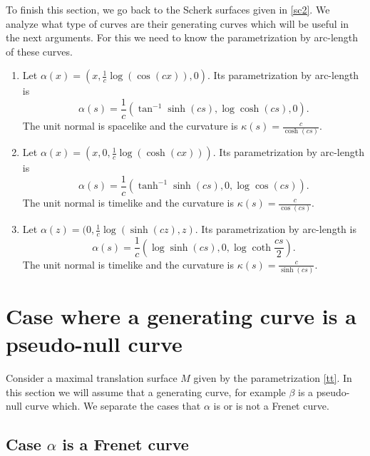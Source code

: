 \documentclass[a4paper,12pt]{amsart}
\numberwithin{equation}{section}
\theoremstyle{definition}
\begin{document}
 To finish this section, we go back to the Scherk surfaces given in \eqref{sc2}. We analyze what type of curves are their generating curves which will be  useful in the next arguments. For this we need to know the parametrization by arc-length of these curves. 
\begin{enumerate}
\item Let $\alpha(x)=(x,\frac{1}{c}\log(\cos (c x)),0)$. Its parametrization by arc-length is 
\begin{equation}\label{cu1}
\alpha(s)=\frac{1}{c}\left(\tan^{-1}\sinh(cs),\log\cosh(cs),0\right).
\end{equation}
The unit normal is spacelike and the curvature is  $\kappa(s)=\frac{c}{\cosh(cs)}$. 

\item Let $\alpha(x)=(x,0,\frac{1}{c}\log(\cosh (c x)))$. Its parametrization by arc-length is
\begin{equation}\label{cu2}
\alpha(s)=\frac{1}{c}\left(\tanh^{-1}\sinh(c s),0,\log\cos(cs)\right).
\end{equation}
The unit normal is timelike and the curvature is   $\kappa(s)=\frac{c}{\cos(cs)}$. 

\item Let $  \alpha(z)=(0,\frac{1}{c}\log(\sinh (cz),z)$. Its parametrization by arc-length is 
\begin{equation}\label{cu3}
\alpha(s)=\frac{1}{c}\left(\log\sinh(c s),0,\log\coth\frac{cs}{2}\right).
\end{equation}
The unit normal is timelike and the curvature is   $\kappa(s)=\frac{c}{\sinh(cs)}$. 
\end{enumerate}
  
\section{Case where a generating curve is a pseudo-null curve}\label{s3}

Consider a maximal translation surface $M$ given by the parametrization \eqref{tt}. In this section we will assume that a generating curve, for example $\beta$ is a pseudo-null curve which.  We separate the cases that $\alpha$ is or is not a Frenet curve.

\subsection{Case $\alpha$ is a Frenet curve}\label{s31} 
\end{document}
